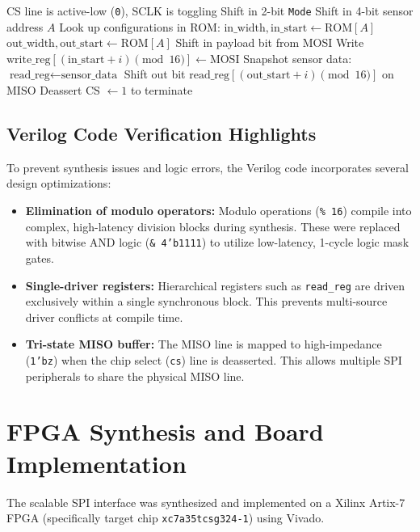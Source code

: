 \documentclass[conference]{IEEEtran}
\begin{document}
\begin{algorithm}[H]
\caption{Method 2 Controller Execution Logic}
\label{alg:method2_logic}
\begin{algorithmic}[1]
\REQUIRE CS line is active-low (\texttt{0}), SCLK is toggling
\STATE Shift in 2-bit \texttt{Mode}
\STATE Shift in 4-bit sensor address $A$
\STATE Look up configurations in ROM:
\STATE \quad $\text{in\_width}, \text{in\_start} \leftarrow \text{ROM}[A]$
\STATE \quad $\text{out\_width}, \text{out\_start} \leftarrow \text{ROM}[A]$
    \STATE Shift in payload bit from MOSI
    \STATE Write $\text{write\_reg}[(\text{in\_start} + i) \pmod{16}] \leftarrow \text{MOSI}$
  \ENDFOR
{}
  \STATE Snapshot sensor data: $\text{read\_reg} \leftarrow \text{sensor\_data}$
    \STATE Shift out bit $\text{read\_reg}[(\text{out\_start} + i) \pmod{16}]$ on MISO
  \ENDFOR
\ENDIF
\STATE Deassert CS $\leftarrow 1$ to terminate
\end{algorithmic}
\end{algorithm}

\subsection{Verilog Code Verification Highlights}
To prevent synthesis issues and logic errors, the Verilog code incorporates several design optimizations:
\begin{itemize}
    \item \textbf{Elimination of modulo operators:} Modulo operations (\texttt{\% 16}) compile into complex, high-latency division blocks during synthesis. These were replaced with bitwise AND logic (\texttt{\& 4'b1111}) to utilize low-latency, 1-cycle logic mask gates.
    \item \textbf{Single-driver registers:} Hierarchical registers such as \texttt{read\_reg} are driven exclusively within a single synchronous block. This prevents multi-source driver conflicts at compile time.
    \item \textbf{Tri-state MISO buffer:} The MISO line is mapped to high-impedance (\texttt{1'bz}) when the chip select (\texttt{cs}) line is deasserted. This allows multiple SPI peripherals to share the physical MISO line.
\end{itemize}

\section{FPGA Synthesis and Board Implementation}
The scalable SPI interface was synthesized and implemented on a Xilinx Artix-7 FPGA (specifically target chip \texttt{xc7a35tcsg324-1}) using Vivado.
\end{document}
